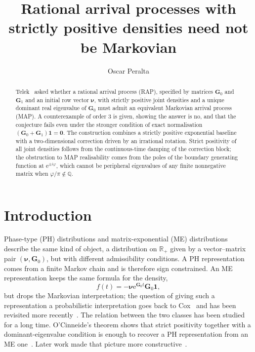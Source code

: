 \documentclass[11pt]{article}
\title{Rational arrival processes with strictly positive densities need not be Markovian}
\author{Oscar Peralta}
\date{}
\theoremstyle{definition}
\theoremstyle{remark}
\newcommand{\e}{\mathrm{e}}
\newcommand{\R}{\mathbb{R}}
\newcommand{\Q}{\mathbb{Q}}
\begin{document}
\maketitle

\begin{abstract}
Telek~\cite{Telek2022} asked whether a rational arrival process (RAP), specified by matrices $\bm{G}_0$ and $\bm{G}_1$ and an initial row vector $\bm{\nu}$, with strictly positive joint densities and a unique dominant real eigenvalue of $\bm{G}_0$ must admit an equivalent Markovian arrival process (MAP). A counterexample of order $3$ is given, showing the answer is no, and that the conjecture fails even under the stronger condition of exact normalisation $(\bm{G}_0+\bm{G}_1)\bm{1}=\bm{0}$. The construction combines a strictly positive exponential baseline with a two-dimensional correction driven by an irrational rotation. Strict positivity of all joint densities follows from the continuous-time damping of the correction block; the obstruction to MAP realisability comes from the poles of the boundary generating function at $\e^{\pm i\varphi}$, which cannot be peripheral eigenvalues of any finite nonnegative matrix when $\varphi/\pi\notin\Q$.
\end{abstract}


\section{Introduction}

Phase-type (PH) distributions and matrix-exponential (ME) distributions describe the same kind of object, a distribution on $\R_+$ given by a vector--matrix pair $(\bm{\nu},\bm{G}_0)$, but with different admissibility conditions. A PH representation comes from a finite Markov chain and is therefore sign constrained. An ME representation keeps the same formula for the density,
\[
f(t)=-\bm{\nu} \e^{\bm{G}_0 t} \bm{G}_0\bm{1},
\]
but drops the Markovian interpretation; the question of giving such a representation a probabilistic interpretation goes back to Cox~\cite{cox1955use} and has been revisited more recently~\cite{peralta2023markov}.
The relation between the two classes has been studied for a long time. O'Cinneide's theorem shows that strict positivity together with a dominant-eigenvalue condition is enough to recover a PH representation from an ME one~\cite{OCinneide1990}. Later work made that picture more constructive~\cite{MocanuCommault1999,CommaultMocanu2003,HorvathTelek2015}.
\end{document}
